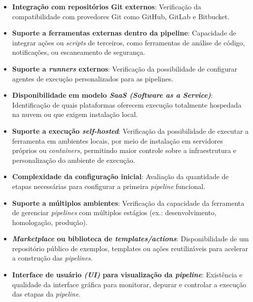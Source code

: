 \begin{itemize}
    \item \textbf{Integração com repositórios Git externos}: Verificação da compatibilidade com provedores Git como GitHub, GitLab e Bitbucket.
    
    \item \textbf{Suporte a ferramentas externas dentro da pipeline}: Capacidade de integrar ações ou \textit{scripts} de terceiros, como ferramentas de análise de código, notificações, ou escaneamento de segurança.
    
    \item \textbf{Suporte a \textit{runners} externos}: Verificação da possibilidade de configurar agentes de execução personalizados para as pipelines.
    
    \item \textbf{Disponibilidade em modelo \textit{SaaS (Software as a Service)}}: Identificação de quais plataformas oferecem execução totalmente hospedada na nuvem ou que exigem instalação local.

    \item \textbf{Suporte a execução \textit{self-hosted}}: Verificação da possibilidade de executar a ferramenta em ambientes locais, por meio de instalação em servidores próprios ou \textit{containers}, permitindo maior controle sobre a infraestrutura e personalização do ambiente de execução.
    
    \item \textbf{Complexidade da configuração inicial}: Avaliação da quantidade de etapas necessárias para configurar a primeira \textit{pipeline} funcional.
    
    \item \textbf{Suporte a múltiplos ambientes}: Verificação da capacidade da ferramenta de gerenciar \textit{pipelines} com múltiplos estágios (ex.: desenvolvimento, homologação, produção).
    
    \item \textbf{\textit{Marketplace} ou biblioteca de \textit{templates/actions}}: Disponibilidade de um repositório público de exemplos, templates ou ações reutilizáveis para acelerar a construção das \textit{pipelines}.
    
    \item \textbf{Interface de usuário \textit{(UI)} para visualização da \textit{pipeline}}: Existência e qualidade da interface gráfica para monitorar, depurar e controlar a execução das etapas da \textit{pipeline}.
    

\end{itemize}
